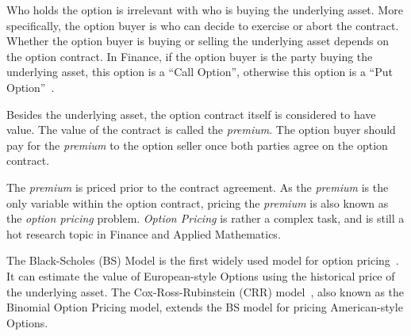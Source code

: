 Who holds the option is irrelevant with who is buying the underlying asset.
More specifically, the option buyer is who can decide to exercise or abort the contract.
Whether the option buyer is buying or selling the underlying asset depends on the option contract.
In Finance, if the option buyer is the party buying the underlying asset, this option is a ``Call Option'',
otherwise this option is a ``Put Option''~\cite{smith2004history-option}.

Besides the underlying asset, the option contract itself is considered to have value.
The value of the contract is called the \textit{premium}.
The option buyer should pay for the \textit{premium} to the option seller once both parties agree on the option contract.

The \textit{premium} is priced prior to the contract agreement.
As the \textit{premium} is the only variable within the option contract,
pricing the \textit{premium} is also known as the \textit{option pricing} problem.
\textit{Option Pricing} is rather a complex task, and is still a hot research topic in Finance and Applied Mathematics.

The Black-Scholes (BS) Model is the first widely used model for option pricing~\cite{black1973pricing}.
It can estimate the value of European-style Options using the historical price of the underlying asset.
The Cox-Ross-Rubinstein (CRR) model~\cite{cox1979option}, also known as the Binomial Option Pricing model, extends the BS model for pricing American-style Options.
